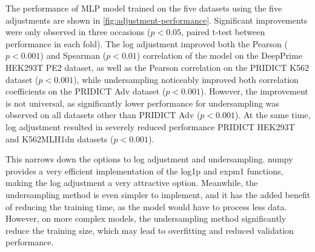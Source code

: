 The performance of MLP model trained on the five datasets using the five adjustments are shown in \autoref{fig:adjustment-performance}. Significant improvements were only observed in three occasions ($p<0.05$, paired t-test between performance in each fold). The log adjustment improved both the Pearson ($p<0.001$) and Spearman ($p<0.01$) correlation of the model on the DeepPrime HEK293T PE2 dataset, as well as the Pearson correlation on the PRIDICT K562 dataset ($p<0.001$), while undersampling noticeably improved both correlation coefficients on the PRIDICT Adv dataset ($p<0.001$). However, the improvement is not universal, as significantly lower performance for undersampling was observed on all datasets other than PRIDICT Adv ($p<0.001$). At the same time, log adjustment resulted in severely reduced performance PRIDICT HEK293T and K562MLH1dn datasets ($p<0.001$). 

This narrows down the options to log adjustment and undersampling. numpy provides a very efficient implementation of the log1p and expm1 functions, making the log adjustment a very attractive option. Meanwhile, the undersampling method is even simpler to implement, and it has the added benefit of reducing the training time, as the model would have to process less data. However, on more complex models, the undersampling method significantly reduce the training size, which may lead to overfitting and reduced validation performance.

